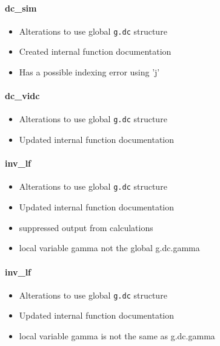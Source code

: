 \documentclass[12pt]{article}
\begin{document}
\paragraph{dc\_sim}
	\begin{itemize}
		\item Alterations to use global \verb|g.dc| structure
		\item Created internal function documentation
		\item Has a possible indexing error using 'j'
	\end{itemize}

\paragraph{dc\_vidc}
	\begin{itemize}
		\item Alterations to use global \verb|g.dc| structure
		\item Updated internal function documentation
	\end{itemize}
\paragraph{inv\_lf}
	\begin{itemize}
		\item Alterations to use global \verb|g.dc| structure
		\item Updated internal function documentation
		\item suppressed output from calculations
		\item local variable gamma not the global g.dc.gamma
	\end{itemize}
\paragraph{inv\_lf}
	\begin{itemize}
		\item Alterations to use global \verb|g.dc| structure
		\item Updated internal function documentation
		\item local variable gamma is not the same as g.dc.gamma
	\end{itemize}
\end{document}
